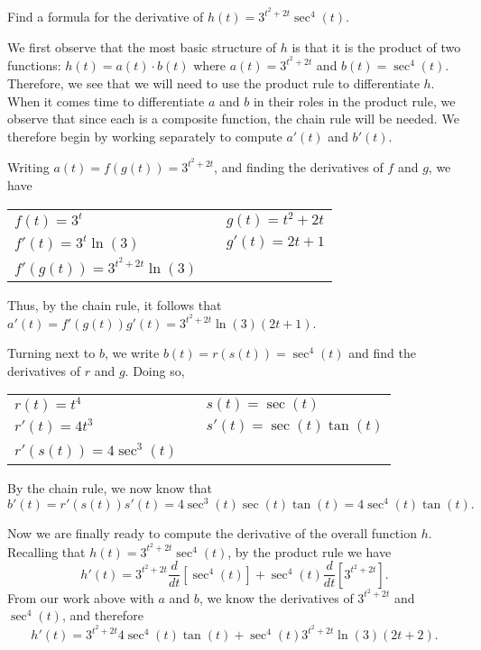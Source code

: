 \begin{example} \label{Ex:2.6.Eg3}
Find a formula for the derivative of $h(t) = 3^{t^2 + 2t}\sec^4(t)$. 

\solution We first observe that the most basic structure of $h$ is that it is the product of two functions:  $h(t) = a(t) \cdot b(t)$ where $a(t) = 3^{t^2 + 2t}$ and $b(t) = \sec^4(t)$.  Therefore, we see that we will need to use the product rule to differentiate $h$.  When it comes time to differentiate $a$ and $b$ in their roles in the product rule, we observe that since each is a composite function, the chain rule will be needed.  We therefore begin by working separately to compute $a'(t)$ and $b'(t)$.

Writing $a(t) = f(g(t)) = 3^{t^2 + 2t}$, and finding the derivatives of $f$ and $g$, we have
\begin{center}
\begin{tabular}{lcl}
$f(t) = 3^t$ & \hspace{0.5in} & $g(t) = t^2 + 2t$ \\
$f'(t) = 3^t \ln(3)$ & \hspace{0.5in} & $g'(t) = 2t+1$ \\
$f'(g(t)) = 3^{t^2 + 2t}\ln(3)$ & \hspace{0.5in} & \ \\
\end{tabular}
\end{center}
Thus, by the chain rule, it follows that $a'(t) = f'(g(t))g'(t) = 3^{t^2 + 2t}\ln(3) (2t+1).$

Turning next to $b$, we write $b(t) = r(s(t)) = \sec^4(t)$ and find the derivatives of $r$ and $g$.  Doing so, 
\begin{center}
\begin{tabular}{lcl}
$r(t) = t^4$ & \hspace{0.5in} & $s(t) = \sec(t)$ \\
$r'(t) = 4t^3$ & \hspace{0.5in} & $s'(t) = \sec(t)\tan(t)$ \\
$r'(s(t)) = 4\sec^3(t)$ & \hspace{0.5in} & \ \\
\end{tabular}
\end{center}
By the chain rule, we now know that 
\[ b'(t) = r'(s(t))s'(t) = 4\sec^3(t)\sec(t)\tan(t) = 4 \sec^4(t) \tan(t). \]

Now we are finally ready to compute the derivative of the overall function $h$.  Recalling that $h(t) = 3^{t^2 + 2t}\sec^4(t)$, by the product rule we have
$$h'(t) = 3^{t^2 + 2t} \frac{d}{dt}[\sec^4(t)] + \sec^4(t) \frac{d}{dt}[3^{t^2 + 2t}].$$
From our work above with $a$ and $b$, we know the derivatives of $3^{t^2 + 2t}$ and $\sec^4(t)$, and therefore
$$h'(t) = 3^{t^2 + 2t} 4\sec^4(t) \tan(t) + \sec^4(t) 3^{t^2 + 2t}\ln(3) (2t+2).$$
\end{example}